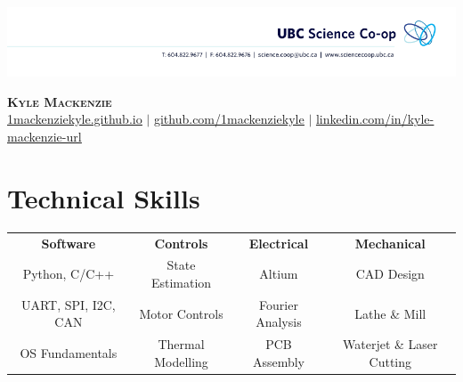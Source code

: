 \documentclass[letterpaper,11pt]{article}
\begin{document}

\begin{center}
\vspace*{-1.5cm}
    \centerline{\includegraphics[width=\paperwidth]{head}}
    \textbf{\Huge \scshape Kyle Mackenzie} \\ \vspace{1pt}
    \small \href{https://1mackenziekyle.github.io}{\underline{1mackenziekyle.github.io}} $|$
    \small \href{https://github.com/1mackenziekyle}{\underline{github.com/1mackenziekyle}} $|$
    \href{https://www.linkedin.com/in/kyle-mackenzie-url/}{\underline{linkedin.com/in/kyle-mackenzie-url}}  
    
    
\end{center}

 
  
%
\section{Technical Skills}
\begin{center}
    \begin{tabular*}{\textwidth}{@{\extracolsep{\fill}}cccc}
        \textbf{Software} & \textbf{Controls} & \textbf{Electrical} & \textbf{Mechanical} \\
        Python, C/C++ & State Estimation & Altium & CAD Design \\
        UART, SPI, I2C, CAN & Motor Controls & Fourier Analysis & Lathe \& Mill \\
        OS Fundamentals & Thermal Modelling & PCB Assembly & Waterjet \& Laser Cutting \\
    \end{tabular*}
\end{center}

\vspace{-7mm}
\end{document}
